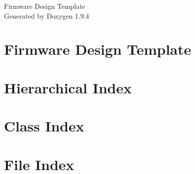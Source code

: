 \documentclass[twoside]{book}
\newcommand{\+}{\discretionary{\mbox{\scriptsize$\hookleftarrow$}}{}{}}
\newcommand{\clearemptydoublepage}{%
    \newpage{\pagestyle{empty}\cleardoublepage}%
  }
\begin{document}
  \raggedbottom
    \hypersetup{pageanchor=false,
                bookmarksnumbered=true,
                pdfencoding=unicode
               }
  \begin{titlepage}
  \vspace*{7cm}
  \begin{center}%
  {\Large Firmware Design Template}\\
  \vspace*{1cm}
  {\large Generated by Doxygen 1.9.4}\\
  \end{center}
  \end{titlepage}
  \clearemptydoublepage
  \tableofcontents
  \clearemptydoublepage
  \hypersetup{pageanchor=true}
\chapter{Firmware Design Template}
\label{index}\hypertarget{index}{}
\chapter{Hierarchical Index}

\chapter{Class Index}

\chapter{File Index}

\end{document}
